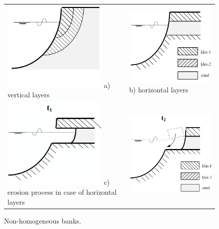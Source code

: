\begin{figure}
\center
\begin{tabular}{p{6cm}p{6cm}}
\includegraphics[width=5cm]{figures/Fig4-8a.png} \linebreak
a) vertical layers &
\includegraphics[width=5cm]{figures/Fig4-8b.png} \linebreak
b) horizontal layers \\
\includegraphics[width=5cm]{figures/Fig4-8c.png} \linebreak
c) erosion process in case of horizontal layers &
\includegraphics[width=5cm]{figures/Fig4-8d.png} \\
\end{tabular}
\caption{Non-homogeneous banks.}
\label{Fig4.8}
\end{figure}

